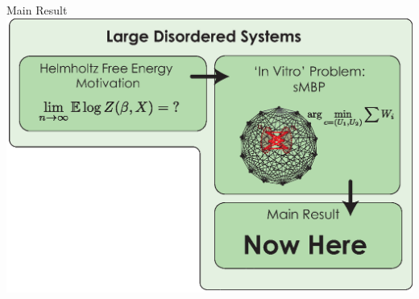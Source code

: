 \documentclass[presentation,12pt]{beamer}
\newcommand{\setroadmapfootline}{%
\setfootline{%
  \textcolor{gray!60}{%
    \tiny\insertshortdate \hfill \insertshortauthor \quad 
    \phantom{\insertframenumber/\inserttotalframenumber}
  }%
}%
}
\def\C{{\cal C}}
\def\X{{\cal X}}
\def\H{{\cal H}}
\begin{document}
{\setroadmapfootline \begin{frame}[noframenumbering]{Main Result}
\centering
\includegraphics[width=\textwidth]{roadmap_after_in_vitro} 
\end{frame}}




  
\end{document}
